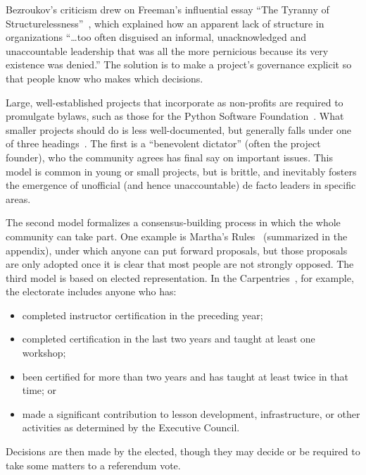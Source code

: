 \documentclass[10pt,letterpaper]{article}
\begin{document}
Bezroukov's criticism drew on Freeman's influential essay ``The Tyranny of Structurelessness''~\cite{freeman1972},
which explained how an apparent lack of structure in organizations ``{\ldots}too often disguised an informal,
unacknowledged and unaccountable leadership that was all the more pernicious because its very existence was denied.''
The solution is to make a project's governance explicit
so that people know who makes which decisions.

Large, well-established projects that incorporate as non-profits are required to promulgate bylaws,
such as those for the Python Software Foundation~\cite{psf-bylaws}.
What smaller projects should do is less well-documented,
but generally falls under one of three headings~\cite{fogel2005}.
The first is a ``benevolent dictator'' (often the project founder),
who the community agrees has final say on important issues.
This model is common in young or small projects,
but is brittle,
and inevitably fosters the emergence of unofficial (and hence unaccountable) de facto leaders
in specific areas.

The second model formalizes a consensus-building process
in which the whole community can take part.
One example is Martha's Rules~\cite{minahan1986} (summarized in the appendix),
under which anyone can put forward proposals,
but those proposals are only adopted once it is clear that most people are not strongly opposed.
The third model is based on elected representation.
In the Carpentries~\cite{carpentries-bylaws},
for example,
the electorate includes anyone who has:

\begin{itemize}

\item
  completed instructor certification in the preceding year;

\item
  completed certification in the last two years and taught at least one workshop;

\item
  been certified for more than two years and has taught at least twice in that time;
  or

\item
  made a significant contribution to lesson development, infrastructure, or other activities
  as determined by the Executive Council.

\end{itemize}

\noindent
Decisions are then made by the elected,
though they may decide or be required to take some matters to a referendum vote.
\end{document}
